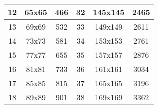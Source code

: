 \begin{appendix}
\begin{table}[htbp]
\begin{tabular}{|c|c|c|c|c|c|}
			12               & 65x65                                                            & 466                                                                          & 32               & 145x145                                                          & 2465                                                                          \\ \hline
			13               & 69x69                                                            & 532                                                                          & 33               & 149x149                                                          & 2611                                                                          \\ \hline
			14               & 73x73                                                            & 581                                                                          & 34               & 153x153                                                          & 2761                                                                          \\ \hline
			15               & 77x77                                                            & 655                                                                          & 35               & 157x157                                                          & 2876                                                                          \\ \hline
			16               & 81x81                                                            & 733                                                                          & 36               & 161x161                                                          & 3034                                                                          \\ \hline
			17               & 85x85                                                            & 815                                                                          & 37               & 165x165                                                          & 3196                                                                          \\ \hline
			18               & 89x89                                                            & 901                                                                          & 38               & 169x169                                                          & 3362                                                                          \\ \hline

\end{tabular}
\end{table}
\end{appendix}
